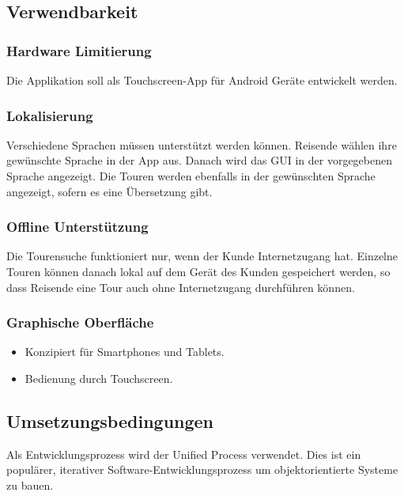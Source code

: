 \documentclass[ngerman,]{article}
\providecommand{\tightlist}{%
  \setlength{\itemsep}{0pt}\setlength{\parskip}{0pt}}
\begin{document}
\subsection{Verwendbarkeit}\label{verwendbarkeit}

\subsubsection{Hardware Limitierung}\label{hardware-limitierung}

Die Applikation soll als Touchscreen-App für Android Geräte entwickelt
werden.

\subsubsection{Lokalisierung}\label{lokalisierung}

Verschiedene Sprachen müssen unterstützt werden können. Reisende wählen
ihre gewünschte Sprache in der App aus. Danach wird das GUI in der
vorgegebenen Sprache angezeigt. Die Touren werden ebenfalls in der
gewünschten Sprache angezeigt, sofern es eine Übersetzung gibt.

\subsubsection{Offline Unterstützung}\label{offline-unterstuxfctzung}

Die Tourensuche funktioniert nur, wenn der Kunde Internetzugang hat.
Einzelne Touren können danach lokal auf dem Gerät des Kunden gespeichert
werden, so dass Reisende eine Tour auch ohne Internetzugang durchführen
können.

\subsubsection{Graphische Oberfläche}\label{graphische-oberfluxe4che}

\begin{itemize}
\tightlist
\item
  Konzipiert für Smartphones und Tablets.
\item
  Bedienung durch Touchscreen.
\end{itemize}

\subsection{Umsetzungsbedingungen}\label{umsetzungsbedingungen}

Als Entwicklungsprozess wird der Unified Process verwendet. Dies ist ein
populärer, iterativer Software-Entwicklungsprozess um objektorientierte
Systeme zu bauen.\cite{UP}
\end{document}
